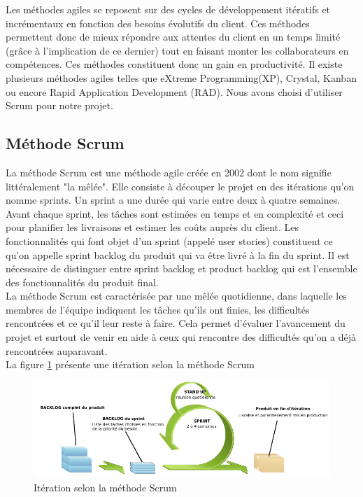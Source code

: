 Les méthodes agiles se reposent sur des cycles de développement itératifs et incrémentaux en fonction des besoins évolutifs du client. Ces méthodes permettent donc de mieux répondre aux attentes du client en un temps limité (grâce à l'implication de ce dernier) tout en faisant monter les collaborateurs en compétences. Ces méthodes constituent donc un gain en productivité.
Il existe plusieurs méthodes agiles telles que eXtreme Programming(XP), Crystal, Kanban ou encore Rapid Application Development (RAD). Nous avons choisi d'utiliser Scrum pour notre projet.
\subsection{Méthode Scrum}
La méthode Scrum est une méthode agile créée en 2002 dont le nom signifie littéralement "la mêlée". Elle consiste à découper le projet en des itérations qu'on nomme sprints. Un sprint a une durée qui varie entre deux à quatre semaines.
Avant chaque sprint, les tâches sont estimées en temps et en complexité et ceci pour planifier les livraisons et estimer les coûts auprès du client. Les fonctionnalités qui font objet d'un sprint (appelé user stories) constituent ce qu'on appelle sprint backlog du produit qui va être livré à la fin du sprint. Il est nécessaire de distinguer entre sprint backlog et product backlog qui est l'ensemble des fonctionnalités du produit final.\\

La méthode Scrum est caractérisée par une mêlée quotidienne, dans laquelle les membres de l'équipe indiquent les tâches qu'ils ont finies, les difficultés rencontrées et ce qu'il leur reste à faire. Cela permet d'évaluer l'avancement du projet et surtout de venir en aide à ceux qui rencontre des difficultés qu'on a déjà rencontrées auparavant.\\

La figure \ref{code3} présente une itération selon la méthode Scrum
\begin{figure}[H]
  \centering
  \includegraphics[scale=0.7]{figures/iteration_scrum.png}
  \caption{Itération selon la méthode Scrum}
  \label{code3}
\end{figure}

